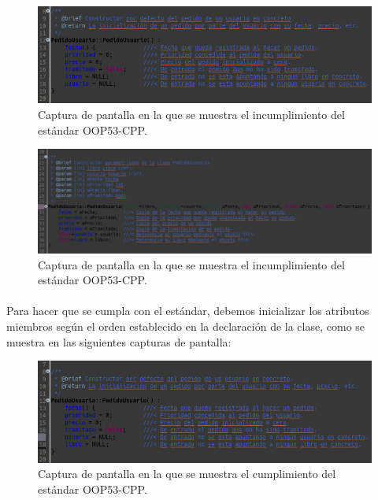 			\begin{figure}[H]
				\centering
				\includegraphics[scale=0.6]{img/captura28.png}
				\caption{Captura de pantalla en la que se muestra el incumplimiento del estándar OOP53-CPP.}
				\label{captura28}
			\end{figure}
		
			\begin{figure}[H]
				\centering
				\includegraphics[scale=0.45]{img/captura30.png}
				\caption{Captura de pantalla en la que se muestra el incumplimiento del estándar OOP53-CPP.}
				\label{captura30}
			\end{figure}
		
			\paragraph{}Para hacer que se cumpla con el estándar, debemos inicializar los atributos miembros según el orden establecido en la declaración de la clase, como se muestra en las siguientes capturas de pantalla:
			
			\begin{figure}[H]
				\centering
				\includegraphics[scale=0.6]{img/captura29.png}
				\caption{Captura de pantalla en la que se muestra el cumplimiento del estándar OOP53-CPP.}
				\label{captura29}
			\end{figure}
		
